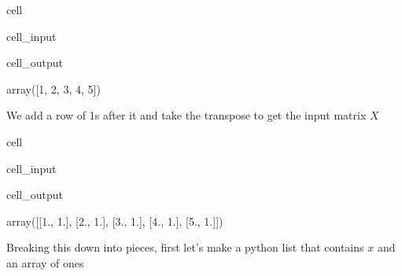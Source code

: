 \documentclass[letterpaper,10pt,english]{jupyterBook}
\begin{document}
\begin{sphinxuseclass}{cell}\begin{sphinxVerbatimInput}

\begin{sphinxuseclass}{cell_input}
\begin{sphinxVerbatim}[commandchars=\\\{\}]
\end{sphinxVerbatim}

\end{sphinxuseclass}\end{sphinxVerbatimInput}
\begin{sphinxVerbatimOutput}

\begin{sphinxuseclass}{cell_output}
\begin{sphinxVerbatim}[commandchars=\\\{\}]
array([1, 2, 3, 4, 5])
\end{sphinxVerbatim}

\end{sphinxuseclass}\end{sphinxVerbatimOutput}

\end{sphinxuseclass}
\sphinxAtStartPar
We add a row of 1s after it and take the transpose to get the input matrix \(X\)

\begin{sphinxuseclass}{cell}\begin{sphinxVerbatimInput}

\begin{sphinxuseclass}{cell_input}
\begin{sphinxVerbatim}[commandchars=\\\{\}]
\end{sphinxVerbatim}

\end{sphinxuseclass}\end{sphinxVerbatimInput}
\begin{sphinxVerbatimOutput}

\begin{sphinxuseclass}{cell_output}
\begin{sphinxVerbatim}[commandchars=\\\{\}]
array([[1., 1.],
       [2., 1.],
       [3., 1.],
       [4., 1.],
       [5., 1.]])
\end{sphinxVerbatim}

\end{sphinxuseclass}\end{sphinxVerbatimOutput}

\end{sphinxuseclass}
\sphinxAtStartPar
Breaking this down into pieces, first let’s make a python list that contains \(x\) and an array of ones
\end{document}
